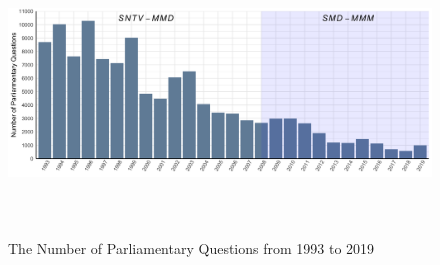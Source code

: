 \begin{figure}[!ht]
    \centering
    \includegraphics[width = 14.5cm, height=7.5cm]{03-Chapter-Three/image/p1.png}
    \caption{The Number of Parliamentary Questions from 1993 to 2019}
    \label{fig:pq}
    \begin{tablenotes}
    \end{tablenotes}
\end{figure}

